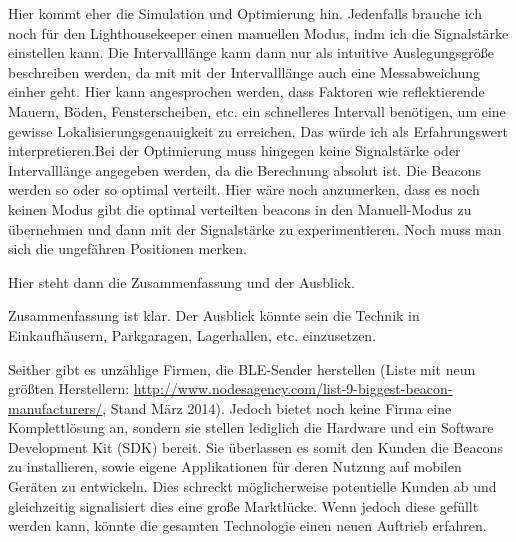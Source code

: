 Hier kommt eher die Simulation und Optimierung hin. Jedenfalls brauche ich noch für den Lighthousekeeper einen manuellen Modus, indm ich die Signalstärke einstellen kann. Die Intervalllänge kann dann nur als intuitive Auslegungsgröße beschreiben werden, da mit mit der Intervalllänge auch eine Messabweichung einher geht. Hier kann angesprochen werden, dass Faktoren wie reflektierende Mauern, Böden, Fensterscheiben, etc. ein schnelleres Intervall benötigen, um eine gewisse Lokalisierungsgenauigkeit zu erreichen. Das würde ich als Erfahrungswert interpretieren.Bei der Optimierung muss hingegen keine Signalstärke oder Intervalllänge angegeben werden, da die Berechnung absolut ist. Die Beacons werden so oder so optimal verteilt. Hier wäre noch anzumerken, dass es noch keinen Modus gibt die optimal verteilten beacons in den Manuell-Modus zu übernehmen und dann mit der Signalstärke zu experimentieren. Noch muss man sich die ungefähren Positionen merken.






Hier steht dann die Zusammenfassung und der Ausblick.


Zusammenfassung ist klar. Der Ausblick könnte sein die Technik in Einkaufhäusern, Parkgaragen, Lagerhallen, etc. einzusetzen. 

Seither gibt es unzählige Firmen, die BLE-Sender herstellen (Liste mit neun größten Herstellern: \url{http://www.nodesagency.com/list-9-biggest-beacon-manufacturers/}, Stand März 2014). Jedoch bietet noch keine Firma eine Komplettlösung an, sondern sie stellen lediglich die Hardware und ein Software Development Kit (SDK) bereit. Sie überlassen es somit den Kunden die Beacons zu installieren, sowie eigene Applikationen für deren Nutzung auf mobilen Geräten zu entwickeln. Dies schreckt möglicherweise potentielle Kunden ab und gleichzeitig signalisiert dies eine große Marktlücke. Wenn jedoch diese gefüllt werden kann, könnte die gesamten Technologie einen neuen Auftrieb erfahren.

